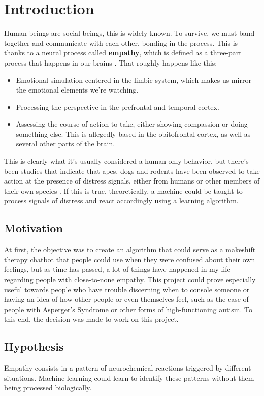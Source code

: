\chapter{Introduction}
Human beings are social beings, this is widely known. To survive, we must band together and communicate with each other, bonding in the process. This is thanks to a neural process called \textbf{empathy}, which is defined as a three-part process that happens in our brains \citep{rf1}. That roughly happens like this:
\begin{itemize}
	\item Emotional simulation centered in the limbic system, which makes us mirror the emotional elements we're watching.
	\item Processing the perspective in the prefrontal and temporal cortex.
	\item Assessing the course of action to take, either showing compassion or doing something else. This is allegedly based in the obitofrontal cortex, as well as several other parts of the brain.
\end{itemize}
This is clearly what it's usually considered a human-only behavior, but there's been studies that indicate that apes, dogs and rodents have been observed to take action at the presence of distress signals, either from humans or other members of their own species \citep{rf2}.
If this is true, theoretically, a machine could be taught to process signals of distress and react accordingly using a learning algorithm.

\section{Motivation}
At first, the objective was to create an algorithm that could serve as a makeshift therapy chatbot that people could use when they were confused about their own feelings, but as time has passed, a lot of things have happened in my life regarding people with close-to-none empathy.
This project could prove especially useful towards people who have trouble discerning when to console someone or having an idea of how other people or even themselves feel, such as the case of people with Asperger's Syndrome or other forms of high-functioning autism.
To this end, the decision was made to work on this project.

\section{Hypothesis}
Empathy consists in a pattern of neurochemical reactions triggered by different situations. Machine learning could learn to identify these patterns without them being processed biologically.

